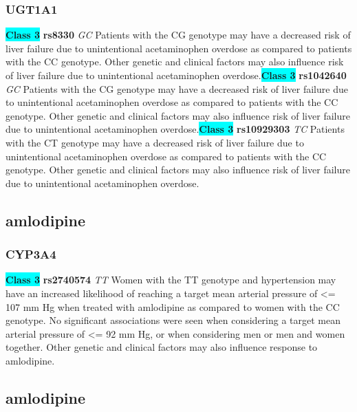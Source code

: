 \documentclass{book}
\begin{document}
\subsubsection{ UGT1A1 }

\begin{center}
\textbf{\colorbox{cyan} {Class 3}} \textbf{ rs8330 } \textit{ GC }
Patients with the CG genotype may have a decreased risk of liver failure due to unintentional acetaminophen overdose as compared to patients with the CC genotype. Other genetic and clinical factors may also influence risk of liver failure due to unintentional acetaminophen overdose.\textbf{\colorbox{cyan} {Class 3}} \textbf{ rs1042640 } \textit{ GC }
Patients with the CG genotype may have a decreased risk of liver failure due to unintentional acetaminophen overdose as compared to patients with the CC genotype. Other genetic and clinical factors may also influence risk of liver failure due to unintentional acetaminophen overdose.\textbf{\colorbox{cyan} {Class 3}} \textbf{ rs10929303 } \textit{ TC }
Patients with the CT genotype may have a decreased risk of liver failure due to unintentional acetaminophen overdose as compared to patients with the CC genotype. Other genetic and clinical factors may also influence risk of liver failure due to unintentional acetaminophen overdose.


\end{center}\subsection{ amlodipine }


\subsubsection{ CYP3A4 }

\begin{center}
\textbf{\colorbox{cyan} {Class 3}} \textbf{ rs2740574 } \textit{ TT }
Women with the TT genotype and hypertension may have an increased likelihood of reaching a target mean arterial pressure of <= 107 mm Hg when treated with amlodipine as compared to women with the CC genotype. No significant associations were seen when considering a target mean arterial pressure of <= 92 mm Hg, or when considering men or men and women together. Other genetic and clinical factors may also influence response to amlodipine.


\end{center}\subsection{ amlodipine }
\end{document}
